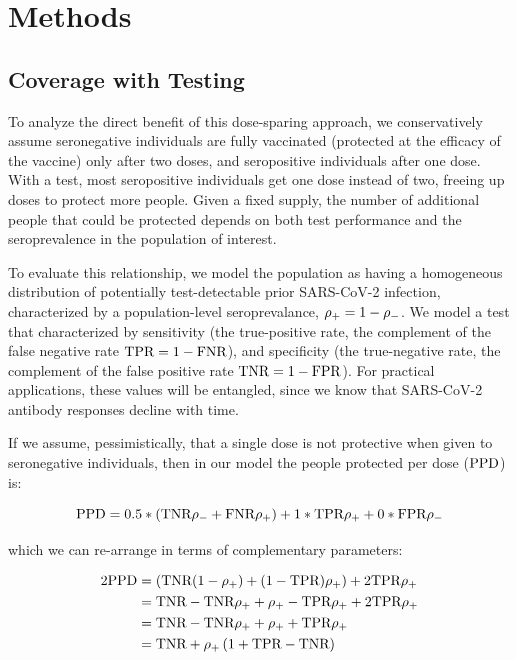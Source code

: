 \documentclass[10pt,a4paper,twocolumn]{article}
\begin{document}
\begin{figure}
\end{figure}

\section*{Methods}

\subsection*{Coverage with Testing}

To analyze the direct benefit of this dose-sparing approach, we conservatively assume seronegative individuals are fully vaccinated (\ie* protected at the efficacy of the vaccine) only after two doses, and seropositive individuals after one dose. With a test, most seropositive individuals get one dose instead of two, freeing up doses to protect more people. Given a fixed supply, the number of additional people that could be protected depends on both test performance and the seroprevalence in the population of interest.

To evaluate this relationship, we model the population as having a homogeneous distribution of potentially test-detectable prior SARS-CoV-2 infection,  characterized by a population-level seroprevalance, $\rho_{{+}} = 1 - \rho_{{-}}$. We model a test that characterized by sensitivity (the true-positive rate, the complement of the false negative rate $\textrm{TPR} = 1 - \textrm{FNR}$), and specificity (the true-negative rate, the complement of the false positive rate $\textrm{TNR} = 1 - \textrm{FPR}$). For practical applications, these values will be entangled, since we know that \eg* SARS-CoV-2 antibody responses decline with time\cite{HARRIS2021}.

If we assume, pessimistically, that a single dose is not protective when given to seronegative individuals, then in our model the people protected per dose ($\textrm{PPD}$) is:

$$
\textrm{PPD} = 0.5*\left(\textrm{TNR}\rho_{{-}} + \textrm{FNR}\rho_{{+}}\right) + 1*\textrm{TPR}\rho_{{+}} + 0*\textrm{FPR}\rho_{{-}}
$$

which we can re-arrange in terms of complementary parameters:

\begin{equation}\label{ppd}
\begin{aligned}
2\textrm{PPD} &= \left(\textrm{TNR}(1-\rho_{{+}}) + (1-\textrm{TPR})\rho_{{+}}\right) + 2\textrm{TPR}\rho_{{+}} \\
&= \textrm{TNR}-\textrm{TNR}\rho_{{+}} + \rho_{{+}} - \textrm{TPR}\rho_{{+}} + 2\textrm{TPR}\rho_{{+}} \\
&= \textrm{TNR} - \textrm{TNR}\rho_{{+}} + \rho_{{+}} + \textrm{TPR}\rho_{{+}} \\
&= \textrm{TNR} + \rho_{{+}}\left(1 + \textrm{TPR}-\textrm{TNR}\right)
\end{aligned}
\end{equation}
\end{document}

